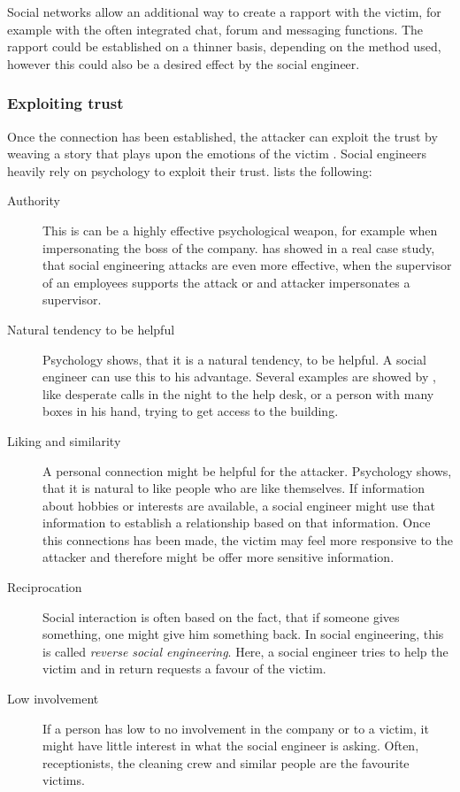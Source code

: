 Social networks allow an additional way to create a rapport with the victim,
for example with the often integrated chat, forum and messaging functions. The
rapport could be established on a thinner basis, depending on the method used,
however this could also be a desired effect by the social engineer.


\subsubsection{Exploiting trust}

Once the connection has been established, the attacker can exploit the trust by
\glqq{}weaving a story that plays upon the emotions of the
victim\grqq{} \cite{thornburgh2004}. Social engineers heavily rely on
psychology to exploit their trust. \cite{jones2004} lists the following:

\begin{description}
\item[Authority] This is can be a highly effective psychological weapon, for
  example when impersonating the boss of the company. \cite{orgill2004} has
  showed in a real case study, that social engineering attacks are even more
  effective, when the supervisor of an employees supports the attack or and
  attacker impersonates a supervisor.
\item[Natural tendency to be helpful] Psychology shows, that it is a natural
  tendency, to be helpful. A social engineer can use this to his advantage.
  Several examples are showed by \cite{mitnick2003}, like desperate calls in
  the night to the help desk, or a person with many boxes in his hand, trying
  to get access to the building.
\item[Liking and similarity] A personal connection might be helpful for the
  attacker. Psychology shows, that it is natural to like people who are like
  themselves. If information about hobbies or interests are available, a social
  engineer might use that information to establish a relationship based on that
  information. Once this connections has been made, the victim may feel more
  responsive to the attacker and therefore might be offer more sensitive
  information.
\item[Reciprocation] Social interaction is often based on the fact, that if
  someone gives something, one might give him something back. In social
  engineering, this is called \textit{reverse social engineering}. Here, a
  social engineer tries to help the victim and in return requests a favour of
  the victim.
\item[Low involvement] If a person has low to no involvement in the company or
  to a victim, it might have little interest in what the social engineer is
  asking. Often, receptionists, the cleaning crew and similar people are the
  favourite victims.
\end{description}

